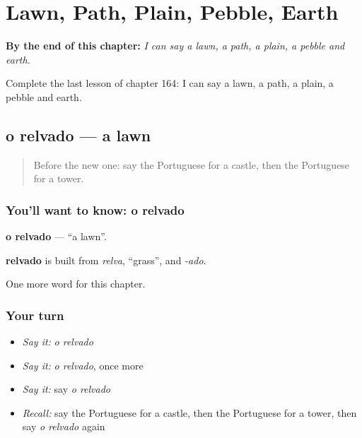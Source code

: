 
\chapter{Lawn, Path, Plain, Pebble, Earth}
\label{ch:pt-lawn-path-plain-pebble-earth}

\begin{chapteropening}
\textbf{By the end of this chapter:} \emph{I can say a lawn, a path, a plain, a pebble and earth.}

Complete the last lesson of chapter 164: I can say a lawn, a path, a plain, a pebble and earth.
\end{chapteropening}

\section[o relvado]{o relvado — a lawn}

\label{lesson:PT-C164-relvado}



\begin{quote}
Before the new one: say the Portuguese for a castle, then the Portuguese for a tower.
\end{quote}

\subsection*{You'll want to know: o relvado}
\textbf{o relvado} — \textquotedblleft{}a lawn\textquotedblright{}.

\begin{cousinweb}
\textbf{relvado} is built from \emph{relva}, \textquotedblleft{}grass\textquotedblright{}, and \emph{-ado}.
\end{cousinweb}

\begin{grammarlens}[title={What you've built}]
One more word for this chapter.
\end{grammarlens}

\subsection*{Your turn}
\begin{itemize}
\raggedright
  \item \emph{Say it:} \emph{o relvado}
  \item \emph{Say it:} \emph{o relvado}, once more
  \item \emph{Say it:} say \emph{o relvado}
  \item \emph{Recall:} say the Portuguese for a castle, then the Portuguese for a tower, then say \emph{o relvado} again
\end{itemize}


